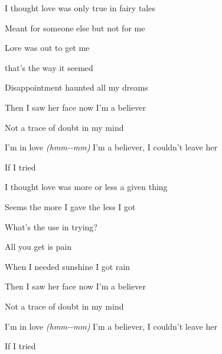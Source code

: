 \begin{song}



\large


\large

\bigskip

I thought love was only true in fairy tales  \par
{}Meant for someone else but not for me \par
{} Love was out to get me  \par
{} that's the way it seemed  \par
{} Disappointment haunted all my dreams  \par

\bigskip

Then I saw her face   now I'm a believer   \par
Not a trace   of doubt in my mind   \par
I'm in love \textit{(hmm-}\textit{-mm)} I'm a believer, I couldn't leave her \par
If I tried \par

\bigskip

I thought love was more or less a given thing \par
{}Seems the more I gave the less I got \par
{}What's the use in trying?  \par
{} All you get is pain  \par
{} When I needed sunshine I got rain  \par

\bigskip

Then I saw her face   now I'm a believer   \par
Not a trace   of doubt in my mind   \par
I'm in love \textit{(hmm-}\textit{-mm)} I'm a believer, I couldn't leave her \par
If I tried \par


\end{song}
